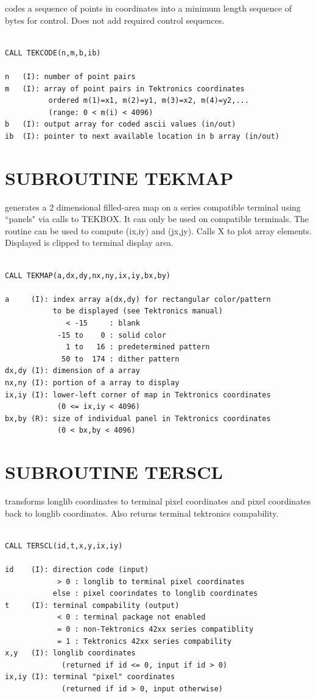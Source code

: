 \documentclass[11pt]{report}
\begin{document}
 codes a sequence of points in  coordinates into
a minimum length sequence of bytes for  control.   Does not add
required control sequences.
\begin{verbatim}

CALL TEKCODE(n,m,b,ib)

n   (I): number of point pairs
m   (I): array of point pairs in Tektronics coordinates
          ordered m(1)=x1, m(2)=y1, m(3)=x2, m(4)=y2,...
          (range: 0 < m(i) < 4096)
b   (I): output array for coded ascii values (in/out)
ib  (I): pointer to next available location in b array (in/out)
\end{verbatim}

\section{SUBROUTINE TEKMAP}

 generates a 2 dimensional filled-area map on a
  series compatible terminal using ``panels"
via calls to TEKBOX.  It can only be used on compatible terminals.
The routine  can be used to compute (ix,iy) and (jx,jy).
Calls X to plot array elements.  Displayed  is clipped
to terminal display area.
\begin{verbatim}

CALL TEKMAP(a,dx,dy,nx,ny,ix,iy,bx,by)

a     (I): index array a(dx,dy) for rectangular color/pattern 
           to be displayed (see Tektronics manual)
              < -15     : blank
            -15 to    0 : solid color 
              1 to   16 : predetermined pattern
             50 to  174 : dither pattern
dx,dy (I): dimension of a array
nx,ny (I): portion of a array to display
ix,iy (I): lower-left corner of map in Tektronics coordinates
            (0 <= ix,iy < 4096)
bx,by (R): size of individual panel in Tektronics coordinates
            (0 < bx,by < 4096)
\end{verbatim}

\section{SUBROUTINE TERSCL}

 transforms longlib coordinates to terminal pixel coordinates
and pixel coordinates back to longlib coordinates.  Also returns
terminal tektronics compability.
\begin{verbatim}

CALL TERSCL(id,t,x,y,ix,iy)

id    (I): direction code (input)
            > 0 : longlib to terminal pixel coordinates
           else : pixel coorindates to longlib coordinates
t     (I): terminal compability (output)
            < 0 : terminal package not enabled
            = 0 : non-Tektronics 42xx series compatiblity
            = 1 : Tektronics 42xx series compability
x,y   (I): longlib coordinates
             (returned if id <= 0, input if id > 0)
ix,iy (I): terminal "pixel" coordinates
             (returned if id > 0, input otherwise)
\end{verbatim}
\end{document}
